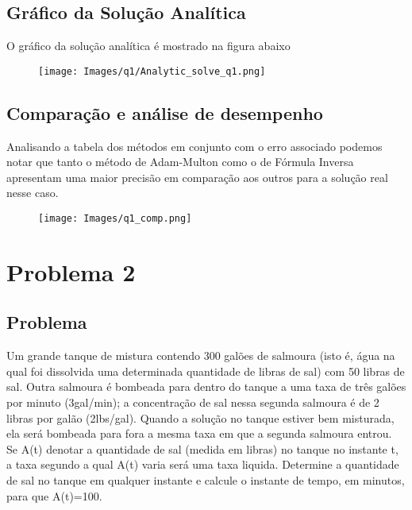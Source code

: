 \documentclass[12pt]{article}
\begin{document}
\subsection{Gráfico da Solução Analítica}
O gráfico da solução analítica é mostrado na figura abaixo

\begin{figure}[H]
\centering
\texttt{[image: Images/q1/Analytic\_solve\_q1.png]}
\label{fig_q1_SA}
\end{figure}

\subsection{Comparação e análise de desempenho}
Analisando a tabela dos métodos em conjunto com o erro associado podemos notar que tanto o método de Adam-Multon como o de Fórmula Inversa apresentam uma maior precisão em comparação aos outros para a solução real nesse caso.
\begin{figure}[H]
\centering
\texttt{[image: Images/q1\_comp.png]}
\label{fig_q1_comp}
\end{figure}





\section{Problema 2}

\subsection{Problema}
Um grande tanque de mistura contendo 300 galões de salmoura (isto é, água na qual foi dissolvida uma determinada quantidade de libras de sal) com 50 libras de sal. Outra salmoura é bombeada para dentro do tanque a uma taxa de três galões por minuto (3gal/min); a concentração de sal nessa segunda salmoura é de 2 libras por galão (2lbs/gal). Quando a solução no tanque estiver bem misturada, ela será bombeada para fora a mesma taxa em que a segunda salmoura entrou. Se A(t) denotar a quantidade de sal (medida em libras) no tanque no instante t, a taxa segundo a qual A(t) varia será uma taxa liquida. Determine a quantidade de sal no tanque em qualquer instante e calcule o instante de tempo, em minutos, para que A(t)=100.
\end{document}
